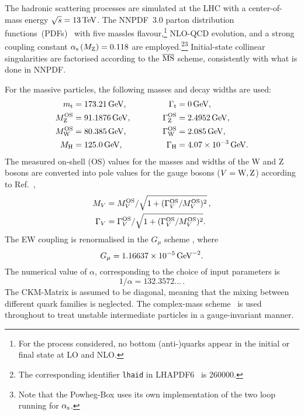The hadronic scattering processes are simulated at the LHC with a center-of-mass energy $\sqrt s = 13 \,\text{TeV}$.
The NNPDF~3.0 parton distribution functions~(PDFs)~\cite{Ball:2014uwa} with five massles flavour,\footnote{
For the process considered, no bottom (anti-)quarks appear in the initial or final state at LO and NLO.} 
NLO-QCD evolution, and a strong coupling constant $\alpha_\text{s}\left( M_\text{Z} \right) = 0.118$ are employed.\footnote{The corresponding identifier {\tt lhaid} in LHAPDF6~\cite{Buckley:2014ana} is 260000.}\footnote{Note that the {\sc Powheg-Box} uses its own implementation of the two loop running for $\alpha_{\rm s}$.}
Initial-state collinear singularities are factorised according to the ${\overline{\rm MS}}$ scheme, consistently with what is done in NNPDF.

For the massive particles, the following masses and decay widths are used:
%
\begin{alignat}{2}
                  m_\text{t}   &=  173.21\,\text{GeV},       & \quad \quad \quad \Gamma_\text{t} &= 0 \,\text{GeV},  \nonumber \\
                M_\text{Z}^\text{OS} &=  91.1876\,\text{GeV},      & \quad \quad \quad \Gamma_\text{Z}^\text{OS} &= 2.4952\,\text{GeV},  \nonumber \\
                M_\text{W}^\text{OS} &=  80.385\,\text{GeV},       & \Gamma_\text{W}^\text{OS} &= 2.085\,\text{GeV},  \nonumber \\
                M_{\rm H} &=  125.0\,\text{GeV},       &  \Gamma_\text{H}   &=  4.07 \times 10^{-3}\,\text{GeV}.
\end{alignat}
%
The measured on-shell (OS) values for the masses and widths of the W and Z bosons are converted into pole values for the gauge bosons ($V=\text{W},\text{Z}$) according to Ref.~\cite{Bardin:1988xt},
%
\begin{equation}
\begin{split}
        M_V &= M_{V}^\text{OS}/\sqrt{1+(\Gamma_{V}^\text{OS}/M_{V}^\text{OS})^2}\,, \\
   \Gamma_V &= \Gamma_{V}^\text{OS}/\sqrt{1+(\Gamma_{V}^\text{OS}/M_{V}^\text{OS})^2}.
\end{split}
\end{equation}
%
The EW coupling is renormalised in the $G_\mu$ scheme \cite{Denner:2000bj}, where
%
\begin{equation}
    G_{\mu}    = 1.16637\times 10^{-5}\,\text{GeV}^{-2}.
\end{equation}
%
The numerical value of $\alpha$, corresponding to the choice of input parameters is
%
\begin{equation}
 1/\alpha = 132.3572\ldots\,.
\end{equation}
The CKM-Matrix is assumed to be diagonal, meaning that the mixing between different quark families is neglected.
The complex-mass scheme~\cite{Denner:1999gp,Denner:2005fg,Denner:2006ic} is used throughout to treat unstable intermediate particles in a gauge-invariant manner.

